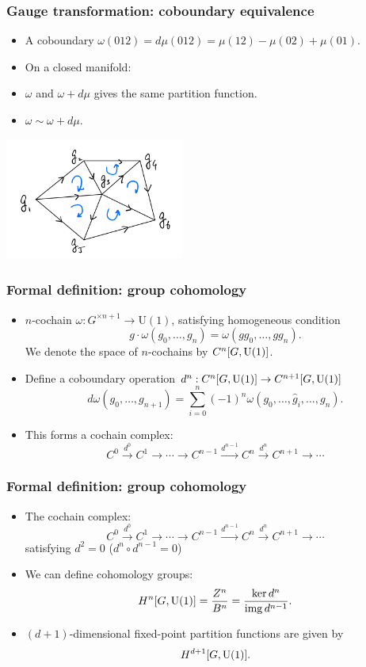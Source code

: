 \documentclass[xcolor=table, aspectratio=169,ignorenonframetext]{beamer}
\DeclareMathOperator{\img}{img}
\begin{document}
\begin{frame}
\frametitle{Gauge transformation: coboundary equivalence}
\begin{itemize}
	\item A coboundary $\omega(012)=d\mu(012)=\mu(12)-\mu(02)+\mu(01)$.
	\item On a \alert{closed} manifold:
	\item $\omega$ and $\omega + d\mu$ gives the same partition function.
	\item $\omega\sim\omega + d\mu$.
\end{itemize}
\begin{center}
\includegraphics[height=4cm]{tri-orient}
\end{center}
\end{frame}

\begin{frame}
\frametitle{Formal definition: group cohomology}
\begin{itemize}
	\item $n$-cochain $\omega: G^{\times n+1}\rightarrow \text{U}(1)$, satisfying homogeneous condition
	\[g\cdot\omega(g_0,\ldots,g_n) = \omega(gg_0,\ldots,gg_n).\]
	We denote the space of $n$-cochains by $C^n[G,\text U(1)]$.
	\item Define a coboundary operation $d^n:C^n[G,\text U(1)]\rightarrow C^{n+1}[G,\text U(1)]$
	\[d\omega(g_0,\ldots,g_{n+1})=\sum_{i=0}^n(-1)^n\omega(g_0,\ldots,\hat g_i,\ldots,g_n).\]
	\item This forms a cochain complex:
	\[C^0\xrightarrow{d^0}C^1\rightarrow\cdots\rightarrow C^{n-1}\xrightarrow{d^{n-1}}C^n\xrightarrow{d^n}C^{n+1}\rightarrow\cdots\]
\end{itemize}
\end{frame}

\begin{frame}
	\frametitle{Formal definition: group cohomology}
	\begin{itemize}
		\item The cochain complex:
		\[C^0\xrightarrow{d^0}C^1\rightarrow\cdots\rightarrow C^{n-1}\xrightarrow{d^{n-1}}C^n\xrightarrow{d^n}C^{n+1}\rightarrow\cdots\]
		satisfying $d^2=0$ ($d^n\circ d^{n-1}=0$)
		\item We can define cohomology groups:
		\[H^n[G,\text U(1)] = \frac{Z^n}{B^n} = \frac{\ker d^n}{\img d^{n-1}}.\]
		\item $(d+1)$-dimensional fixed-point partition functions are given by
		\[H^{d+1}[G,\text U(1)].\]
	\end{itemize}
\end{frame}
\end{document}
